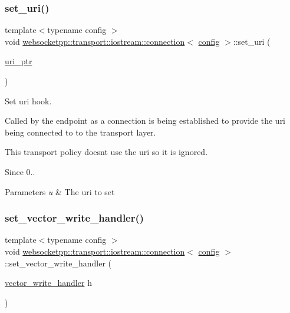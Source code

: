 \subsubsection{\texorpdfstring{set\+\_\+uri()}{set\_uri()}}
{\footnotesize\ttfamily template$<$typename config $>$ \\
void \mbox{\hyperlink{classwebsocketpp_1_1transport_1_1iostream_1_1connection}{websocketpp\+::transport\+::iostream\+::connection}}$<$ \mbox{\hyperlink{classconfig}{config}} $>$\+::set\+\_\+uri (\begin{DoxyParamCaption}\item[{\mbox{\hyperlink{namespacewebsocketpp_aae370ea5ac83a8ece7712cb39fc23f5b}{uri\+\_\+ptr}}}]{ }\end{DoxyParamCaption})\hspace{0.3cm}{\ttfamily [inline]}}



Set uri hook. 

Called by the endpoint as a connection is being established to provide the uri being connected to to the transport layer.

This transport policy doesn\textquotesingle{}t use the uri so it is ignored.

\begin{DoxySince}{Since}
0..
\end{DoxySince}

\begin{DoxyParams}{Parameters}
{\em u} & The uri to set \\
\hline
\end{DoxyParams}
\mbox{\label{classwebsocketpp_1_1transport_1_1iostream_1_1connection_aa035dc6275c5babb99c0cbada8521b5c}} 
\subsubsection{\texorpdfstring{set\+\_\+vector\+\_\+write\+\_\+handler()}{set\_vector\_write\_handler()}}
{\footnotesize\ttfamily template$<$typename config $>$ \\
void \mbox{\hyperlink{classwebsocketpp_1_1transport_1_1iostream_1_1connection}{websocketpp\+::transport\+::iostream\+::connection}}$<$ \mbox{\hyperlink{classconfig}{config}} $>$\+::set\+\_\+vector\+\_\+write\+\_\+handler (\begin{DoxyParamCaption}\item[{\mbox{\hyperlink{namespacewebsocketpp_1_1transport_1_1iostream_a21982146513c0b5580786c3af5dd2878}{vector\+\_\+write\+\_\+handler}}}]{h }\end{DoxyParamCaption})\hspace{0.3cm}{\ttfamily [inline]}}



